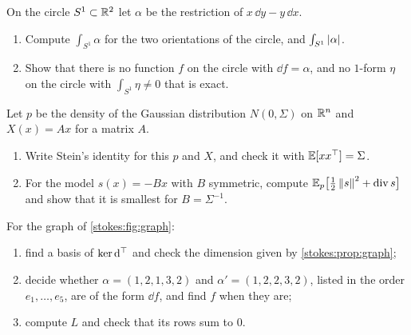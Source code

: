 \begin{notechapter}
\begin{exercise}\label{stokes:exr:7}
On the circle $S^1\subset\mathbb{R}^2$ let $\alpha$ be the restriction of
$x\,\dd y - y\,\dd x$.
\begin{enumerate}[nosep]
  \item Compute $\int_{S^1}\alpha$ for the two orientations of the
        circle, and $\int_{S^1}\left|\alpha\right|$.
  \item Show that there is no function $f$ on the circle with
        $\dd f = \alpha$, and no $1$-form $\eta$ on the circle with
        $\int_{S^1}\eta\neq0$ that is exact.
\end{enumerate}
\end{exercise}

\begin{exercise}\label{stokes:exr:8}
Let $p$ be the density of the Gaussian distribution $N(0, \Sigma)$ on
$\mathbb{R}^n$ and $X(x) = Ax$ for a matrix $A$.
\begin{enumerate}[nosep]
  \item Write Stein's identity for this $p$ and $X$, and check it with
        $\mathbb{E}[xx^\top] = \Sigma$.
  \item For the model $s(x) = -Bx$ with $B$ symmetric, compute
        $\mathbb{E}_p\bigl[\frac12\left\|s\right\|^2 + \operatorname{div}s\bigr]$ and
        show that it is smallest for $B = \Sigma^{-1}$.
\end{enumerate}
\end{exercise}

\begin{exercise}\label{stokes:exr:9}
For the graph of \cref{stokes:fig:graph}:
\begin{enumerate}[nosep]
  \item find a basis of $\ker\mathrm{d}^{\top}$ and check the dimension given by
        \cref{stokes:prop:graph};
  \item decide whether $\alpha = (1, 2, 1, 3, 2)$ and
        $\alpha' = (1, 2, 2, 3, 2)$, listed in the order
        $e_1,\dots,e_5$, are of the form $\dd f$, and find $f$ when
        they are;
  \item compute $L$ and check that its rows sum to $0$.
\end{enumerate}
\end{exercise}
\end{notechapter}
